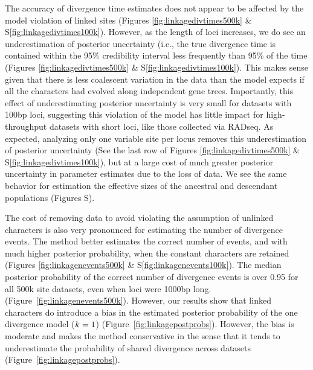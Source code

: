 The accuracy of divergence time estimates does not appear to be affected by the
model violation of linked sites
(Figures \ref{fig:linkagedivtimes500k}
\&
S\ref{fig:linkagedivtimes100k}).
However,
as the length of loci increases, we do see an underestimation
of posterior uncertainty (i.e., the 
true divergence time is contained within the 95\% credibility interval 
less frequently than 95\% of the time
(Figures \ref{fig:linkagedivtimes500k}
\&
S\ref{fig:linkagedivtimes100k}).
This makes sense given that there is less coalescent variation in the data than
the model expects if all the characters had evolved along independent gene
trees.
Importantly, this effect of underestimating posterior uncertainty is very small
for datasets with 100bp loci, suggesting this violation of the model has little
impact for high-throughput datasets with short loci, like those collected via
RADseq.
As expected, analyzing only one variable site per locus removes this underestimation
of posterior uncertainty
(See the last row of Figures \ref{fig:linkagedivtimes500k}
\&
S\ref{fig:linkagedivtimes100k}),
but at a large cost of much greater posterior uncertainty in parameter
estimates due to the loss of data.
We see the same behavior for estimation the effective sizes of the ancestral
and descendant populations
(Figures S).

The cost of removing data to avoid violating the assumption of unlinked
characters is also very pronounced for estimating the number of divergence
events.
The method better estimates the correct number of events, and with much higher
posterior probability, when the constant characters are retained 
(Figures
\ref{fig:linkagenevents500k}
\&
S\ref{fig:linkagenevents100k}).
The median posterior probability of the correct number of divergence events is
over 0.95 for all 500k site datasets, even when loci were 1000bp long.
(Figure~\ref{fig:linkagenevents500k}).
However, our results show that linked characters do introduce a bias in the
estimated posterior probability of the one divergence model ($k_{} = 1$)
(Figure~\ref{fig:linkagepostprobs}).
However, the bias is moderate and makes the method conservative in the
sense that it tends to underestimate the probability of shared
divergence across datasets (Figure~\ref{fig:linkagepostprobs}).

